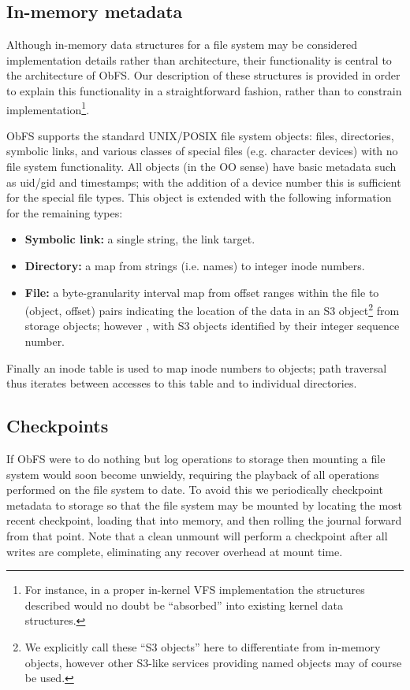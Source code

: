 \documentclass[sigconf,anonymous,10pt]{acmart}
\begin{document}
\begin{CCSXML}
\subsection{In-memory metadata}
Although in-memory data structures for a file system may be considered implementation details rather than architecture, their functionality is central to the architecture of ObFS.
Our description of these structures is provided in order to explain this functionality in a straightforward fashion, rather than to constrain implementation\footnote{For instance, in a proper in-kernel VFS implementation the structures described would no doubt be ``absorbed'' into existing kernel data structures.}.

ObFS supports the standard UNIX/POSIX file system objects: files, directories, symbolic links, and various classes of special files (e.g. character devices) with no file system functionality.
All objects (in the OO sense) have basic metadata such as uid/gid and timestamps; with the addition of a device number this is sufficient for the special file types.
This object is extended with the following information for the remaining types:
\begin{itemize}[nosep]
\item \textbf{Symbolic link:} a single string, the link target.
\item \textbf{Directory:} a map from strings (i.e. names) to integer inode numbers.
\item \textbf{File:} a byte-granularity interval map from offset ranges within the file to (object, offset) pairs indicating the location of the data in an S3 object\footnote{We explicitly call these ``S3 objects'' here to differentiate from in-memory objects, however other S3-like services providing named objects may of course be used.} from storage objects; however , with S3 objects identified by their integer sequence number.
\end{itemize}

Finally an inode table is used to map inode numbers to objects; path traversal thus iterates between accesses to this table and to individual directories.

\subsection{Checkpoints}

If ObFS were to do nothing but log operations to storage then mounting a file system would soon become unwieldy, requiring the playback of all operations performed on the file system to date.
To avoid this we periodically checkpoint metadata to storage so that the file system may be mounted by locating the most recent checkpoint, loading that into memory, and then rolling the journal forward from that point.
Note that a clean unmount will perform a checkpoint after all writes are complete, eliminating any recover overhead at mount time.


\end{CCSXML}
\end{document}

